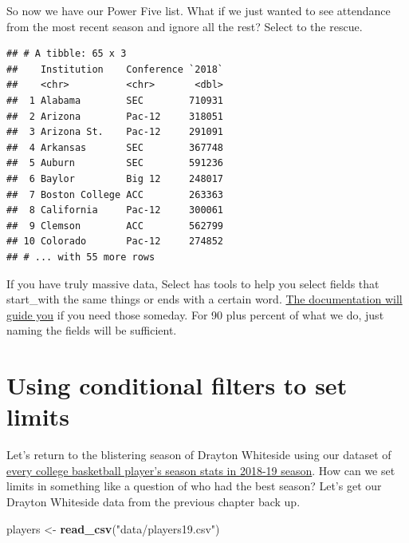 \documentclass[]{book}
\newenvironment{Shaded}{\begin{snugshade}}{\end{snugshade}}
\newcommand{\DataTypeTok}[1]{\textcolor[rgb]{0.13,0.29,0.53}{#1}}
\newcommand{\KeywordTok}[1]{\textcolor[rgb]{0.13,0.29,0.53}{\textbf{#1}}}
\newcommand{\NormalTok}[1]{#1}
\newcommand{\OperatorTok}[1]{\textcolor[rgb]{0.81,0.36,0.00}{\textbf{#1}}}
\newcommand{\StringTok}[1]{\textcolor[rgb]{0.31,0.60,0.02}{#1}}
\begin{document}
So now we have our Power Five list. What if we just wanted to see attendance from the most recent season and ignore all the rest? Select to the rescue.

\begin{Shaded}
\end{Shaded}

\begin{verbatim}
## # A tibble: 65 x 3
##    Institution    Conference `2018`
##    <chr>          <chr>       <dbl>
##  1 Alabama        SEC        710931
##  2 Arizona        Pac-12     318051
##  3 Arizona St.    Pac-12     291091
##  4 Arkansas       SEC        367748
##  5 Auburn         SEC        591236
##  6 Baylor         Big 12     248017
##  7 Boston College ACC        263363
##  8 California     Pac-12     300061
##  9 Clemson        ACC        562799
## 10 Colorado       Pac-12     274852
## # ... with 55 more rows
\end{verbatim}

If you have truly massive data, Select has tools to help you select fields that start\_with the same things or ends with a certain word. \href{https://dplyr.tidyverse.org/reference/select.html}{The documentation will guide you} if you need those someday. For 90 plus percent of what we do, just naming the fields will be sufficient.

\hypertarget{using-conditional-filters-to-set-limits}{%
\section{Using conditional filters to set limits}\label{using-conditional-filters-to-set-limits}}

Let's return to the blistering season of Drayton Whiteside using our dataset of \href{https://unl.box.com/s/s1wzw61u9ia50qmirfhuvprgpmmah9rj}{every college basketball player's season stats in 2018-19 season}. How can we set limits in something like a question of who had the best season? Let's get our Drayton Whiteside data from the previous chapter back up.

\begin{Shaded}
\begin{Highlighting}[]
\NormalTok{players <-}\StringTok{ }\KeywordTok{read_csv}\NormalTok{(}\StringTok{"data/players19.csv"}\NormalTok{)}
\end{Highlighting}
\end{Shaded}
\end{document}
